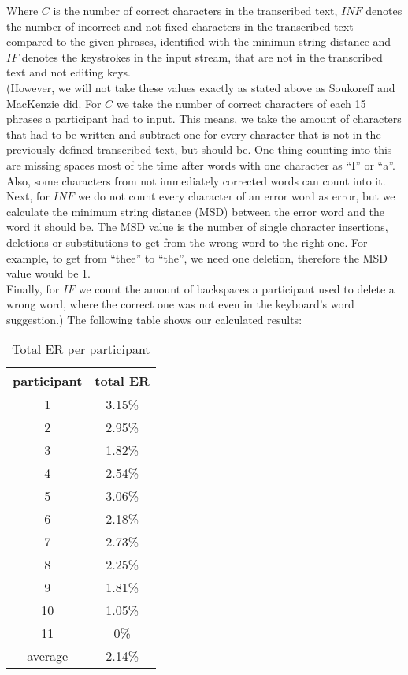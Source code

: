 Where $C$ is the number of correct characters in the transcribed text, $INF$ denotes the number of incorrect and not fixed characters in the transcribed text compared to the given phrases, identified with the minimun string distance and $IF$ denotes the keystrokes in the input stream, that are not in the transcribed text and not editing keys.\\
(However, we will not take these values exactly as stated above as Soukoreff and MacKenzie \cite{10.1145/642611.642632} did. For $C$ we take the number of correct characters of each 15 phrases a participant had to input. This means, we take the amount of characters that had to be written and subtract one for every character that is not in the previously defined transcribed text, but should be. One thing counting into this are missing spaces most of the time after words with one character as ``I'' or ``a''. Also, some characters from not immediately corrected words can count into it.\\
Next, for $INF$ we do not count every character of an error word as error, but we calculate the minimum string distance (MSD) between the error word and the word it should be. The MSD value is the number of single character insertions, deletions or substitutions to get from the wrong word to the right one. For example, to get from ``thee'' to ``the'', we need one deletion, therefore the MSD value would be 1.\\
Finally, for $IF$ we count the amount of backspaces a participant used to delete a wrong word, where the correct one was not even in the keyboard's word suggestion.) The following table shows our calculated results:
\begin{table}[H]
    \centering
    \caption{Total ER per participant}
    \begin{tabular}{cc} \toprule
        participant&total ER\\ \midrule
        1&3.15\%\\
        2&2.95\%\\
        3&1.82\%\\
        4&2.54\%\\
        5&3.06\%\\
        6&2.18\%\\
        7&2.73\%\\
        8&2.25\%\\
        9&1.81\%\\
        10&1.05\%\\
        11&0\%\\\bottomrule
        average&2.14\%\\
        \bottomrule
    \end{tabular}
    \label{tab:total_er}
\end{table}
